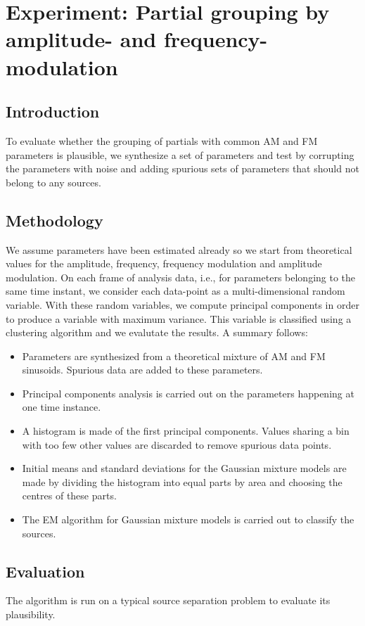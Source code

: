 \chapter{Experiment: Partial grouping by amplitude- and frequency-modulation}

\section{Introduction}
To evaluate whether the grouping of partials with common AM and FM parameters is
plausible, we synthesize a set of parameters and test by corrupting the
parameters with noise and adding spurious sets of parameters that should not
belong to any sources.

\section{Methodology}
We assume parameters have been estimated already so we start from theoretical
values for the amplitude, frequency, frequency modulation and amplitude
modulation.  On each frame of analysis data, i.e., for parameters belonging to
the same time instant, we consider each data-point as a multi-dimensional random
variable. With these random variables, we compute principal components in order
to produce a variable with maximum variance. This variable is classified using a
clustering algorithm and we evalutate the results. A summary follows:
\begin{itemize}
    \item 
        Parameters are synthesized from a theoretical mixture of AM and FM
        sinusoids.  Spurious data are added to these parameters.
    \item
        Principal components analysis is carried out on the parameters happening
        at one time instance.
    \item
        A histogram is made of the first principal components. Values sharing a
        bin with too few other values are discarded to remove spurious data
        points.
    \item
        Initial means and standard deviations for the Gaussian mixture models
        are made by dividing the histogram into equal parts by area and choosing
        the centres of these parts.
    \item
        The EM algorithm for Gaussian mixture models is carried out to classify
        the sources.
\end{itemize}
\section{Evaluation}
The algorithm is run on a typical source separation problem to evaluate its
plausibility.
